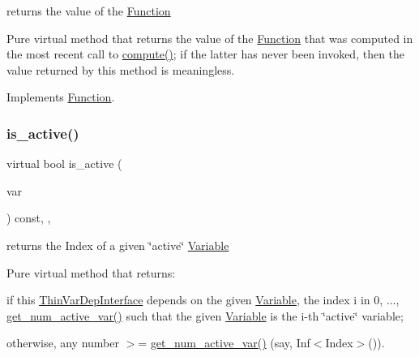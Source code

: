 returns the value of the \mbox{\hyperlink{class_s_m_spp__di__unipi__it_1_1_function}{Function}} 

Pure virtual method that returns the value of the \mbox{\hyperlink{class_s_m_spp__di__unipi__it_1_1_function}{Function}} that was computed in the most recent call to \mbox{\hyperlink{class_s_m_spp__di__unipi__it_1_1_function_a504d4e3e174c7a518cc66156a8a45ce5}{compute()}}; if the latter has never been invoked, then the value returned by this method is meaningless. 

Implements \mbox{\hyperlink{class_s_m_spp__di__unipi__it_1_1_function_a040b4850ae0a23a1c9ff79b497b6eaaf}{Function}}.

\mbox{\label{class_s_m_spp__di__unipi__it_1_1_d_quad_function_a5412d6d119f09c9e958bcf0800fcdeaa}} 
\subsubsection{\texorpdfstring{is\+\_\+active()}{is\_active()}}
{\footnotesize\ttfamily virtual bool is\+\_\+active (\begin{DoxyParamCaption}\item[{const \mbox{\hyperlink{class_s_m_spp__di__unipi__it_1_1_variable}{Variable}} $\ast$const}]{var }\end{DoxyParamCaption}) const\hspace{0.3cm}{\ttfamily [inline]}, {\ttfamily [override]}, {\ttfamily [virtual]}}



returns the Index of a given \char`\"{}active\char`\"{} \mbox{\hyperlink{class_s_m_spp__di__unipi__it_1_1_variable}{Variable}} 

Pure virtual method that returns\+:


\begin{DoxyItemize}
\item if this \mbox{\hyperlink{class_s_m_spp__di__unipi__it_1_1_thin_var_dep_interface}{Thin\+Var\+Dep\+Interface}} depends on the given \mbox{\hyperlink{class_s_m_spp__di__unipi__it_1_1_variable}{Variable}}, the index i in 0, ..., \mbox{\hyperlink{class_s_m_spp__di__unipi__it_1_1_d_quad_function_af7f92d9890df5e47c25215b99f97caef}{get\+\_\+num\+\_\+active\+\_\+var()}} such that the given \mbox{\hyperlink{class_s_m_spp__di__unipi__it_1_1_variable}{Variable}} is the i-\/th \char`\"{}active\char`\"{} variable;
\item otherwise, any number $>$= \mbox{\hyperlink{class_s_m_spp__di__unipi__it_1_1_d_quad_function_af7f92d9890df5e47c25215b99f97caef}{get\+\_\+num\+\_\+active\+\_\+var()}} (say, Inf$<$\+Index$>$()).
\end{DoxyItemize}


